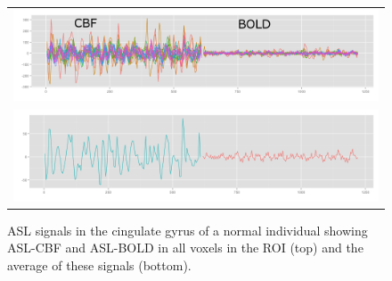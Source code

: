 \documentclass{llncs}
\begin{document}
\begin{figure}[tb]
\begin{center}
\begin{tabular}{ c }
\includegraphics[width=0.9\linewidth]{all_signals3.png}\\
\includegraphics[width=0.9\linewidth]{roi_signals3.png} \\
\end{tabular}
\caption{ ASL signals in the cingulate gyrus of a normal individual showing ASL-CBF and ASL-BOLD in all voxels in the ROI (top) and the average of these signals (bottom).}
\label{fig:signals}
\end{center}
\end{figure}
\end{document}
